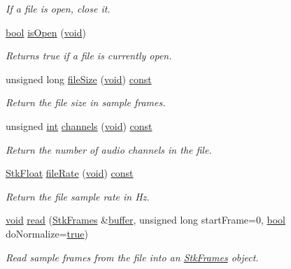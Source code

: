 \begin{DoxyCompactItemize}
\begin{DoxyCompactList}\small\item\em If a file is open, close it. \end{DoxyCompactList}\item 
\hyperlink{mac_2config_2i386_2lib-src_2libsoxr_2soxr-config_8h_abb452686968e48b67397da5f97445f5b}{bool} \hyperlink{class_nyq_1_1_file_read_a1a0ae01a8e2b289d76b0ad3cb11017b6}{is\+Open} (\hyperlink{sound_8c_ae35f5844602719cf66324f4de2a658b3}{void})
\begin{DoxyCompactList}\small\item\em Returns {\itshape true} if a file is currently open. \end{DoxyCompactList}\item 
unsigned long \hyperlink{class_nyq_1_1_file_read_a81110965cdfd1f5dedddf2ee498da240}{file\+Size} (\hyperlink{sound_8c_ae35f5844602719cf66324f4de2a658b3}{void}) \hyperlink{getopt1_8c_a2c212835823e3c54a8ab6d95c652660e}{const} 
\begin{DoxyCompactList}\small\item\em Return the file size in sample frames. \end{DoxyCompactList}\item 
unsigned \hyperlink{xmltok_8h_a5a0d4a5641ce434f1d23533f2b2e6653}{int} \hyperlink{class_nyq_1_1_file_read_aba228608b2321a5933345d91441f00b2}{channels} (\hyperlink{sound_8c_ae35f5844602719cf66324f4de2a658b3}{void}) \hyperlink{getopt1_8c_a2c212835823e3c54a8ab6d95c652660e}{const} 
\begin{DoxyCompactList}\small\item\em Return the number of audio channels in the file. \end{DoxyCompactList}\item 
\hyperlink{namespace_nyq_a044fa20a706520a617bbbf458a7db7e4}{Stk\+Float} \hyperlink{class_nyq_1_1_file_read_a3b376d1f9692890fa6e16c4bd8d2bd68}{file\+Rate} (\hyperlink{sound_8c_ae35f5844602719cf66324f4de2a658b3}{void}) \hyperlink{getopt1_8c_a2c212835823e3c54a8ab6d95c652660e}{const} 
\begin{DoxyCompactList}\small\item\em Return the file sample rate in Hz. \end{DoxyCompactList}\item 
\hyperlink{sound_8c_ae35f5844602719cf66324f4de2a658b3}{void} \hyperlink{class_nyq_1_1_file_read_af870f4c9f1ce8e760bcabcfc23980ad4}{read} (\hyperlink{class_nyq_1_1_stk_frames}{Stk\+Frames} \&\hyperlink{structbuffer}{buffer}, unsigned long start\+Frame=0, \hyperlink{mac_2config_2i386_2lib-src_2libsoxr_2soxr-config_8h_abb452686968e48b67397da5f97445f5b}{bool} do\+Normalize=\hyperlink{mac_2config_2i386_2lib-src_2libsoxr_2soxr-config_8h_a41f9c5fb8b08eb5dc3edce4dcb37fee7}{true})
\begin{DoxyCompactList}\small\item\em Read sample frames from the file into an \hyperlink{class_nyq_1_1_stk_frames}{Stk\+Frames} object. \end{DoxyCompactList}\end{DoxyCompactItemize}
